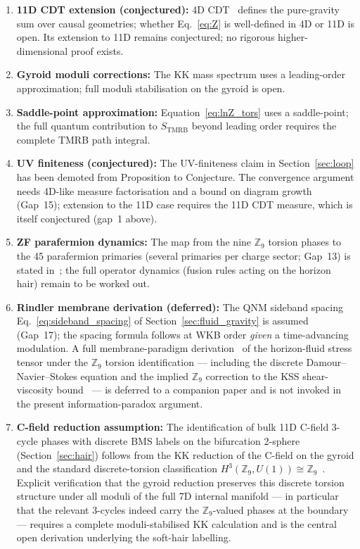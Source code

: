 \documentclass[11pt,a4paper]{article}
\begin{document}
\begin{enumerate}[leftmargin=*, label=\arabic*.]
  \item \textbf{11D CDT extension (conjectured):} 4D CDT~\cite{AJL2004,AJL2005}
    defines the pure-gravity sum over causal geometries; whether
    Eq.~\eqref{eq:Z} is well-defined in 4D or 11D is open.
    Its extension to 11D remains conjectured; no rigorous higher-dimensional
    proof exists.
  \item \textbf{Gyroid moduli corrections:} The KK mass spectrum uses a
    leading-order approximation; full moduli stabilisation on the gyroid is open.
  \item \textbf{Saddle-point approximation:} Equation~\eqref{eq:lnZ_tors}
    uses a saddle-point; the full quantum contribution to $S_{\mathrm{TMRB}}$
    beyond leading order requires the complete TMRB path integral.
  \item \textbf{UV finiteness (conjectured):} The UV-finiteness claim in
    Section~\ref{sec:loop} has been demoted from Proposition to Conjecture.
    The convergence argument needs 4D-like measure factorisation and a
    bound on diagram growth (Gap~15);
    extension to the 11D case requires the 11D CDT measure, which is itself
    conjectured (gap~1 above).
  \item \textbf{ZF parafermion dynamics:} The map from the nine $\mathbb{Z}_9$
    torsion phases to the 45 parafermion primaries (several primaries per
    charge sector; Gap~13) is stated in~\cite{BresslerCH2026}; the full operator dynamics (fusion rules acting on
    the horizon hair) remain to be worked out.
  \item \textbf{Rindler membrane derivation (deferred):} The QNM sideband
    spacing Eq.~\eqref{eq:sideband_spacing} of Section~\ref{sec:fluid_gravity} is
    assumed (Gap~17); the spacing formula follows at WKB order \emph{given} a time-advancing modulation.
    A full
    membrane-paradigm derivation~\cite{Damour1978} of the horizon-fluid stress
    tensor under the $\mathbb{Z}_9$ torsion identification --- including the
    discrete Damour--Navier--Stokes equation and the implied $\mathbb{Z}_9$
    correction to the KSS shear-viscosity bound~\cite{KSS2005} --- is
    deferred to a companion paper and is not invoked in the present
    information-paradox argument.
  \item \textbf{C-field reduction assumption:} The identification of bulk
    11D C-field 3-cycle phases with discrete BMS labels on the bifurcation
    2-sphere (Section~\ref{sec:hair}) follows from the KK reduction of
    the C-field on the gyroid and the standard discrete-torsion classification
    $H^3(\mathbb{Z}_9, U(1)) \cong \mathbb{Z}_9$~\cite{DijkgraafWitten1990}.
    Explicit verification that the gyroid reduction preserves this discrete
    torsion structure under all moduli of the full 7D internal manifold ---
    in particular that the relevant 3-cycles indeed carry the
    $\mathbb{Z}_9$-valued phases at the boundary --- requires a complete
    moduli-stabilised KK calculation and is the central open derivation
    underlying the soft-hair labelling.


\end{enumerate}
\end{document}
